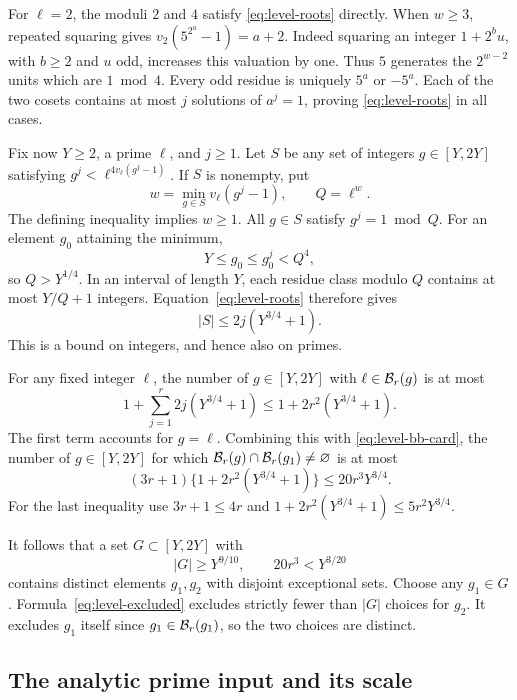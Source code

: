 For \(\ell=2\), the moduli \(2\) and \(4\) satisfy
\eqref{eq:level-roots} directly. When \(w\geq3\), repeated squaring
gives
\(v_2(5^{2^a}-1)=a+2\).
Indeed squaring an integer \(1+2^b u\), with \(b\geq2\) and \(u\)
odd, increases this valuation by one. Thus \(5\) generates the
\(2^{w-2}\) units which are \(1\bmod4\). Every odd residue is
uniquely \(5^a\) or \(-5^a\). Each of the two cosets contains at
most \(j\) solutions of \(a^j=1\), proving
\eqref{eq:level-roots} in all cases.

Fix now \(Y\geq2\), a prime \(\ell\), and \(j\geq1\).
Let \(S\) be any set of integers \(g\in[Y,2Y]\) satisfying
\(g^j<\ell^{4v_\ell(g^j-1)}\).
If \(S\) is nonempty, put
\[
            w=\min_{g\in S}v_\ell(g^j-1),\qquad Q=\ell^w .
\]
The defining inequality implies \(w\geq1\).
All \(g\in S\) satisfy \(g^j=1\bmod Q\).
For an element \(g_0\) attaining the minimum,
\[
                 Y\leq g_0\leq g_0^j<Q^4 ,
\]
so \(Q>Y^{1/4}\). In an interval of length \(Y\), each residue
class modulo \(Q\) contains at most \(Y/Q+1\) integers.
Equation~\eqref{eq:level-roots} therefore gives
\begin{equation}
 \label{eq:level-exception-fixed}
                 |S|\leq2j(Y^{3/4}+1).
\end{equation}
This is a bound on integers, and hence also on primes.

For any fixed integer \(\ell\), the number of \(g\in[Y,2Y]\) with
\(\ell\in{\cal B}_r(g)\) is at most
\[
 1+\sum_{j=1}^{r}2j(Y^{3/4}+1)
                  \leq1+2r^2(Y^{3/4}+1).
\]
The first term accounts for \(g=\ell\).
Combining this with \eqref{eq:level-bb-card}, the number of
\(g\in[Y,2Y]\) for which
\({\cal B}_r(g)\cap{\cal B}_r(g_1)\ne\varnothing\) is at most
\begin{equation}
 \label{eq:level-excluded}
       (3r+1)\{1+2r^2(Y^{3/4}+1)\}
                       \leq20r^3Y^{3/4}.
\end{equation}
For the last inequality use \(3r+1\leq4r\) and
\(1+2r^2(Y^{3/4}+1)\leq5r^2Y^{3/4}\).

It follows that a set \(G\subset[Y,2Y]\) with
\[
                  |G|\geq Y^{9/10},
       \qquad 20r^3<Y^{3/20}
\]
contains distinct elements \(g_1,g_2\) with disjoint exceptional
sets. Choose any \(g_1\in G\). Formula~\eqref{eq:level-excluded}
excludes strictly fewer than \(|G|\) choices for \(g_2\).
It excludes \(g_1\) itself since \(g_1\in{\cal B}_r(g_1)\), so
the two choices are distinct.

\subsection{The analytic prime input and its scale}

